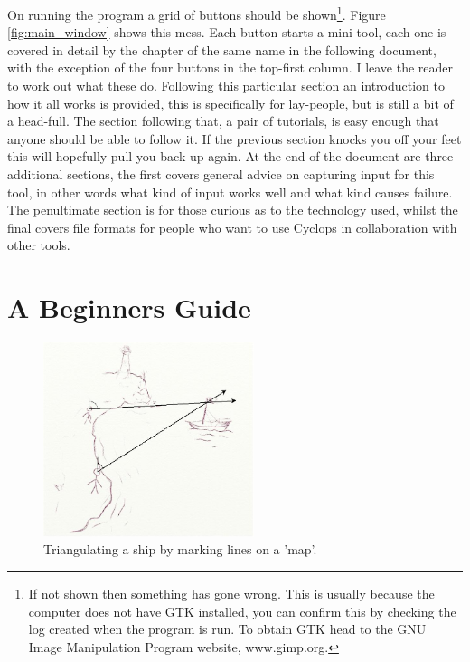 \documentclass[10pt,a4paper,twoside]{article}
\begin{document}
On running the program a grid of buttons should be shown\footnote{If not shown then something has gone wrong. This is usually because the computer does not have GTK installed, you can confirm this by checking the log created when the program is run. To obtain GTK head to the GNU Image Manipulation Program website, www.gimp.org.}. Figure \ref{fig:main_window} shows this mess. Each button starts a mini-tool, each one is covered in detail by the chapter of the same name in the following document, with the exception of the four buttons in the top-first column. I leave the reader to work out what these do. Following this particular section an introduction to how it all works is provided, this is specifically for lay-people, but is still a bit of a head-full. The section following that, a pair of tutorials, is easy enough that anyone should be able to follow it. If the previous section knocks you off your feet this will hopefully pull you back up again. At the end of the document are three additional sections, the first covers general advice on capturing input for this tool, in other words what kind of input works well and what kind causes failure. The penultimate section is for those curious as to the technology used, whilst the final covers file formats for people who want to use Cyclops in collaboration with other tools.

 

\section{A Beginners Guide}

\begin{figure}[t]
 \centering
 \includegraphics[width=0.55\textwidth]{diags/ship_map}
 \caption{Triangulating a ship by marking lines on a 'map'.}
 \label{fig:ship_map}
\end{figure}
\end{document}
